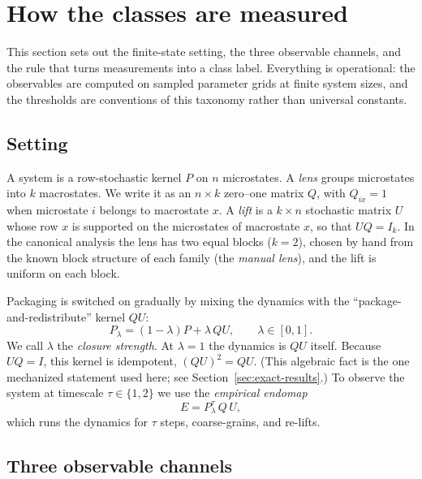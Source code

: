 \section{How the classes are measured}
\label{sec:observables-evidence}

This section sets out the finite-state setting, the three observable channels, and the rule that turns measurements into a class label. Everything is operational: the observables are computed on sampled parameter grids at finite system sizes, and the thresholds are conventions of this taxonomy rather than universal constants.

\subsection{Setting}

A system is a row-stochastic kernel $P$ on $n$ microstates. A \emph{lens} groups microstates into $k$ macrostates. We write it as an $n\times k$ zero--one matrix $Q$, with $Q_{ix}=1$ when microstate $i$ belongs to macrostate $x$. A \emph{lift} is a $k\times n$ stochastic matrix $U$ whose row $x$ is supported on the microstates of macrostate $x$, so that $UQ=I_k$. In the canonical analysis the lens has two equal blocks ($k=2$), chosen by hand from the known block structure of each family (the \emph{manual lens}), and the lift is uniform on each block.

Packaging is switched on gradually by mixing the dynamics with the ``package-and-redistribute'' kernel $QU$:
\[
P_\lambda=(1-\lambda)P+\lambda\,QU,\qquad \lambda\in[0,1].
\]
We call $\lambda$ the \emph{closure strength}. At $\lambda=1$ the dynamics is $QU$ itself. Because $UQ=I$, this kernel is idempotent, $(QU)^2=QU$. (This algebraic fact is the one mechanized statement used here; see Section~\ref{sec:exact-results}.) To observe the system at timescale $\tau\in\{1,2\}$ we use the \emph{empirical endomap}
\[
E=P_\lambda^{\tau}\,Q\,U,
\]
which runs the dynamics for $\tau$ steps, coarse-grains, and re-lifts.

\subsection{Three observable channels}

